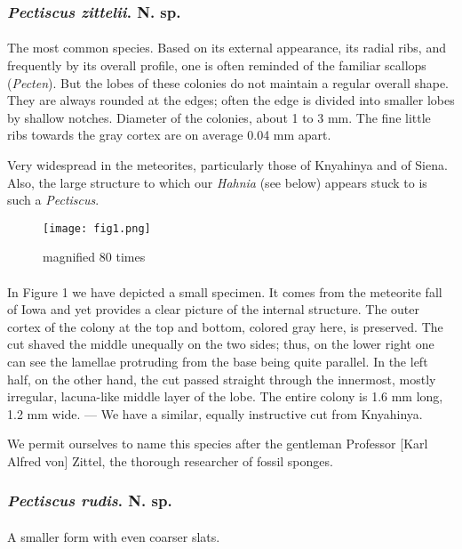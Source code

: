 \documentclass[a4paper, 12pt, oneside]{article}
\begin{document}
\subsubsection{\emph{Pectiscus zittelii}. N. sp.}
\paragraph{}
The most common species. Based on its external appearance, its radial ribs, and frequently by its overall profile, one is often reminded of the familiar scallops (\emph{Pecten}). But the lobes of these colonies do not maintain a regular overall shape. They are always rounded at the edges; often the edge is divided into smaller lobes by shallow notches. Diameter of the colonies, about 1 to 3 mm. The fine little ribs towards the gray cortex are on average 0.04 mm apart.

Very widespread in the meteorites, particularly those of Knyahinya and of Siena. Also, the large structure to which our \emph{Hahnia} (see below) appears stuck to is such a \emph{Pectiscus}.
\begin{figure}[H]
\centering
\texttt{[image: fig1.png]}
\caption{magnified 80 times}
\end{figure}
\paragraph{}
In Figure 1 we have depicted a small specimen. It comes from the meteorite fall of Iowa and yet provides a clear picture of the internal structure. The outer cortex of the colony at the top and bottom, colored gray here, is preserved. The cut shaved the middle unequally on the two sides; thus, on the lower right one can see the lamellae protruding from the base being quite parallel. In the left half, on the other hand, the cut passed straight through the innermost, mostly irregular, lacuna-like middle layer of the lobe. The entire colony is 1.6 mm long, 1.2 mm wide. --- We have a similar, equally instructive cut from Knyahinya.

We permit ourselves to name this species after the gentleman Professor [Karl Alfred von] Zittel, the thorough researcher of fossil sponges.
\subsubsection{\emph{Pectiscus rudis}. N. sp.}
\paragraph{}
A smaller form with even coarser slats.
\end{document}
